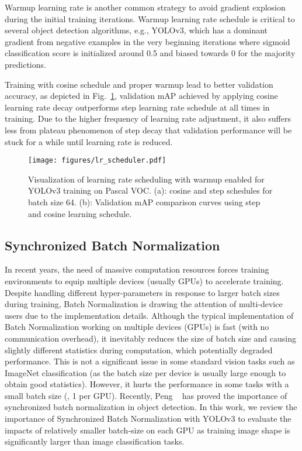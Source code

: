 \documentclass[10pt,twocolumn,letterpaper]{article}
\begin{document}
Warmup learning rate is another common strategy to avoid gradient explosion during the initial training iterations. Warmup learning rate schedule is critical to several object detection algorithms, e.g., YOLOv3, which has a dominant gradient from negative examples in the very beginning iterations where sigmoid classification score is initialized around 0.5 and biased towards 0 for the majority predictions.

Training with cosine schedule and proper warmup lead to better validation accuracy, as depicted in Fig.~\ref{fig:lr_schedule}, validation mAP achieved by applying cosine learning rate decay outperforms step learning rate schedule at all times in training. Due to the higher frequency of learning rate adjustment, it also suffers less from plateau phenomenon of step decay that validation performance will be stuck for a while until learning rate is reduced. 

\begin{figure}[t!]
  \centering
    \texttt{[image: figures/lr\_scheduler.pdf]}
  \caption{Visualization of learning rate scheduling with warmup enabled for YOLOv3 training on Pascal VOC. (a): cosine and step schedules for batch size 64. (b): Validation mAP comparison curves using step and cosine learning schedule.}
  \label{fig:lr_schedule}
\end{figure}



\subsection{Synchronized Batch Normalization}

In recent years, the need of massive computation resources forces training environments to equip multiple devices (usually GPUs) to accelerate training. Despite handling different hyper-parameters in response to larger batch sizes during training, Batch Normalization \cite{ioffe2015batch} is drawing the attention of multi-device users due to the implementation details. Although the typical implementation of Batch Normalization working on multiple devices (GPUs) is fast (with no communication overhead), it inevitably reduces the size of batch size and causing slightly different statistics during computation, which potentially degraded performance. This is not a significant issue in some standard vision tasks such as ImageNet classification (as the batch size per device is usually large enough to obtain good statistics). However, it hurts the performance in some tasks with a small batch size (\eg, 1 per GPU). Recently, Peng \etal~\cite{peng2018megdet} has proved the importance of synchronized batch normalization in object detection. 
In this work, we review the importance of Synchronized Batch Normalization with YOLOv3 \cite{redmon2018yolov3} to evaluate the impacts of relatively smaller batch-size on each GPU as training image shape is significantly larger than image classification tasks.
\end{document}
